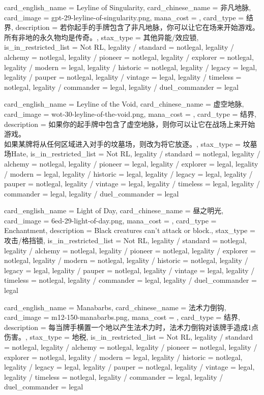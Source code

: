 \documentclass[lang = cn, color = black, 10pt]{AllThatStax}
\begin{document}
\card
{
	card_english_name = {Leyline of Singularity},
	card_chinese_name = {非凡地脉},
	card_image = gpt-29-leyline-of-singularity.png,
	mana_cost = ,
	card_type = 结界,
	description = {若你起手的手牌包含了非凡地脉，你可以让它在场来开始游戏。\\
		所有非地的永久物均是传奇。},
	stax_type = 其他异能/效应锁,
	is_in_restricted_list = Not RL,
	legality / standard = notlegal,
	legality / alchemy = notlegal,
	legality / pioneer = notlegal,
	legality / explorer = notlegal,
	legality / modern = legal,
	legality / historic = notlegal,
	legality / legacy = legal,
	legality / pauper = notlegal,
	legality / vintage = legal,
	legality / timeless = notlegal,
	legality / commander = legal,
	legality / duel_commander = legal
}

\card
{
	card_english_name = {Leyline of the Void},
	card_chinese_name = {虚空地脉},
	card_image = wot-30-leyline-of-the-void.png,
	mana_cost = ,
	card_type = 结界,
	description = {如果你的起手牌中包含了虚空地脉，则你可以让它在战场上来开始游戏。\\
		如果某牌将从任何区域进入对手的坟墓场，则改为将它放逐。},
	stax_type = 坟墓场Hate,
	is_in_restricted_list = Not RL,
	legality / standard = notlegal,
	legality / alchemy = notlegal,
	legality / pioneer = legal,
	legality / explorer = legal,
	legality / modern = legal,
	legality / historic = legal,
	legality / legacy = legal,
	legality / pauper = notlegal,
	legality / vintage = legal,
	legality / timeless = legal,
	legality / commander = legal,
	legality / duel_commander = legal
}

\card
{
	card_english_name = {Light of Day},
	card_chinese_name = {昼之明光},
	card_image = 6ed-29-light-of-day.png,
	mana_cost = ,
	card_type = Enchantment,
	description = {Black creatures can't attack or block.},
	stax_type = 攻击/格挡锁,
	is_in_restricted_list = Not RL,
	legality / standard = notlegal,
	legality / alchemy = notlegal,
	legality / pioneer = notlegal,
	legality / explorer = notlegal,
	legality / modern = notlegal,
	legality / historic = notlegal,
	legality / legacy = legal,
	legality / pauper = notlegal,
	legality / vintage = legal,
	legality / timeless = notlegal,
	legality / commander = legal,
	legality / duel_commander = legal
}

\card
{
	card_english_name = {Manabarbs},
	card_chinese_name = {法术力倒钩},
	card_image = m12-150-manabarbs.png,
	mana_cost = ,
	card_type = 结界,
	description = {每当牌手横置一个地以产生法术力时，法术力倒钩对该牌手造成1点伤害。},
	stax_type = 地税,
	is_in_restricted_list = Not RL,
	legality / standard = notlegal,
	legality / alchemy = notlegal,
	legality / pioneer = notlegal,
	legality / explorer = notlegal,
	legality / modern = legal,
	legality / historic = notlegal,
	legality / legacy = legal,
	legality / pauper = notlegal,
	legality / vintage = legal,
	legality / timeless = notlegal,
	legality / commander = legal,
	legality / duel_commander = legal
}
\end{document}
